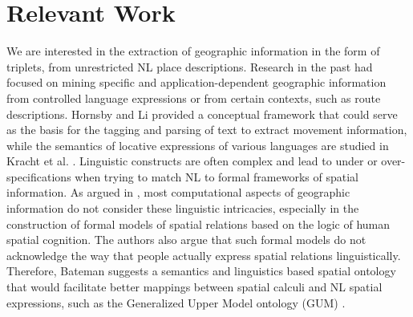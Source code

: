 \documentclass[letter]{sig-alternate}
\begin{document}
\section{Relevant Work}
We are interested in the extraction of geographic information in the form of triplets, from unrestricted NL place descriptions. Research in the past had focused on mining specific and application-dependent geographic information from controlled language expressions \cite{kelleher:perceptually, Hanjing:route, tappan:knowledge} or from certain contexts, such as route descriptions. Hornsby and Li \cite{hornsby:conceptual} provided a conceptual framework that could serve as the basis for the tagging and parsing of text to extract movement information, while the semantics of locative expressions of various languages are studied in Kracht et al. \cite{kracht:semantics}. Linguistic constructs are often complex and lead to under or over-specifications when trying to match NL to formal frameworks of spatial information. As argued in \cite{Bateman:ontology}, most computational aspects of geographic information do not consider these linguistic intricacies, especially in the construction of formal models of spatial relations based on the logic of human spatial cognition. The authors also argue that such formal models do not acknowledge the way that people actually express spatial relations linguistically. Therefore, Bateman \cite{Bateman:language} suggests a semantics and linguistics based spatial ontology that would facilitate better mappings between spatial calculi and NL spatial expressions, such as the Generalized Upper Model ontology (GUM) \cite{Bateman:data}.
\end{document}
